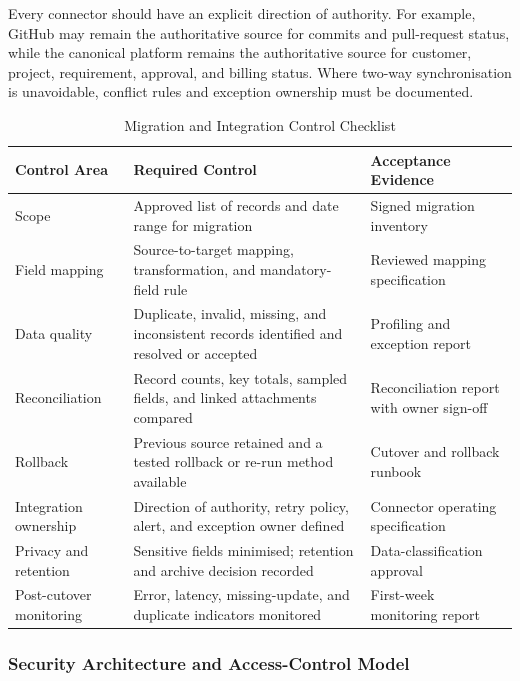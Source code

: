 \documentclass[12pt,a4paper]{report}
\begin{document}
Every connector should have an explicit direction of authority. For example, GitHub may remain the
authoritative source for commits and pull-request status, while the canonical platform remains the
authoritative source for customer, project, requirement, approval, and billing status. Where two-way
synchronisation is unavoidable, conflict rules and exception ownership must be documented.

\begin{table}[H]
\centering
\caption{Migration and Integration Control Checklist}
\label{tab:migration-controls}
\small
\renewcommand{\arraystretch}{1.17}
\begin{tabularx}{\textwidth}{>{\raggedright\arraybackslash}p{2.7cm}
                                >{\raggedright\arraybackslash}X
                                >{\raggedright\arraybackslash}p{3.4cm}}
\toprule
\textbf{Control Area} & \textbf{Required Control} & \textbf{Acceptance Evidence} \\
\midrule
Scope & Approved list of records and date range for migration & Signed migration inventory \\
Field mapping & Source-to-target mapping, transformation, and mandatory-field rule & Reviewed mapping specification \\
Data quality & Duplicate, invalid, missing, and inconsistent records identified and resolved or accepted & Profiling and exception report \\
Reconciliation & Record counts, key totals, sampled fields, and linked attachments compared & Reconciliation report with owner sign-off \\
Rollback & Previous source retained and a tested rollback or re-run method available & Cutover and rollback runbook \\
Integration ownership & Direction of authority, retry policy, alert, and exception owner defined & Connector operating specification \\
Privacy and retention & Sensitive fields minimised; retention and archive decision recorded & Data-classification approval \\
Post-cutover monitoring & Error, latency, missing-update, and duplicate indicators monitored & First-week monitoring report \\
\bottomrule
\end{tabularx}
\end{table}

\subsubsection{Security Architecture and Access-Control Model}
\label{sec:security-architecture}
\end{document}
